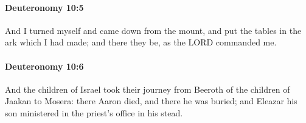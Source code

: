 		\paragraph{Deuteronomy 10:5} %
			\label{DEUTERONOMY-10-5}

			And I turned myself and came down from the mount, and put the tables in the ark which I had made; and there they be, as the LORD commanded me.


		\paragraph{Deuteronomy 10:6} %
			\label{DEUTERONOMY-10-6}

			And the children of Israel took their journey from Beeroth of the children of Jaakan to Mosera: there Aaron died, and there he was buried; and Eleazar his son ministered in the priest's office in his stead.

